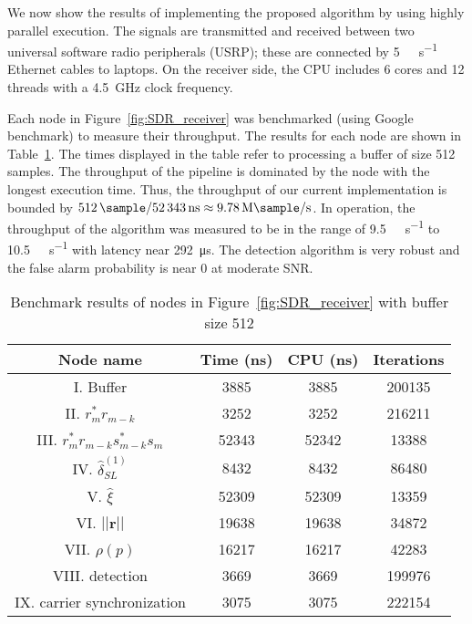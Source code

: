 We now show the results of implementing the proposed algorithm
by using
highly parallel execution.
The signals are transmitted and received between two universal software radio peripherals (USRP);
these are connected by \SI[per-mode=symbol]{5}{\giga\bits\per\second} Ethernet cables to
laptops.
On the receiver side, 
the CPU includes 6 cores and 12 threads with a \SI{4.5}{\giga\hertz}
clock frequency.

Each node in Figure~\ref{fig:SDR_receiver} was benchmarked (using Google benchmark) to measure their throughput.
The results for each node are shown 
in Table~\ref{table:BM_function_nodes}.
The times displayed in the table
refer to processing a  buffer of size 512 samples.
The throughput of the 
pipeline is dominated by the node with the longest execution time.
Thus, the  throughput of our current implementation is bounded by
$\SI{512}{\sample}/\SI{52343}{\nano\second}  \approx \SI[per-mode=symbol]{9.78}{\mega\sample\per\second}$.
In operation, the throughput of the algorithm was measured to be in
the range of
\SI[per-mode=symbol]{9.5}{\mega\sample\per\second} to \SI[per-mode=symbol]{10.5}{\mega\sample\per\second} with latency near \SI{292}{\micro\second}.
The detection algorithm is very robust and the false alarm probability is near 0 at moderate SNR.

\begin{table}[t]
    \caption{Benchmark results of nodes in Figure~\ref{fig:SDR_receiver} with buffer size 512}  %
    \centering %
    \begin{tabular}{c c c c} %
    \hline\hline %
    Node name & Time (ns) & CPU (ns) & Iterations \\ [0.5ex] %
    \hline %
    I. Buffer  & 3885 & 3885 & 200135 \\ %
    II. $r_m^*r_{m-k}$  & 3252 & 3252 & 216211 \\
    III. $r_m^*r_{m-k}s_{m-k}^*s_m$ & 52343 & 52342 & 13388 \\
    IV. $\hat{\delta}_{SL}^{(1)}$ & 8432 & 8432 & 86480 \\
    V. $\hat{\xi}$ & 52309 & 52309 & 13359 \\
    VI. $||\bm{r}||$ & 19638 & 19638 & 34872 \\ %
    VII. $\rho(p)$ & 16217 & 16217 & 42283 \\
    VIII. detection & 3669 & 3669 & 199976 \\
    IX. carrier synchronization & 3075 & 3075 & 222154  \\ [1ex]
    \hline
    \end{tabular}
    \label{table:BM_function_nodes} %
  \end{table}

